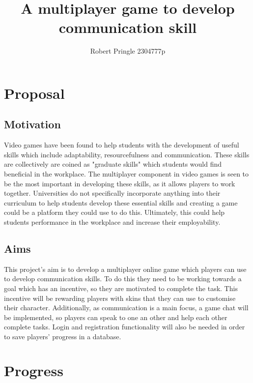 \documentclass[11pt]{article}
\title{A multiplayer game to develop communication skill}
\author{Robert Pringle 2304777p}
\begin{document}
    \maketitle

\section{Proposal}\label{proposal}

\subsection{Motivation}\label{motivation}

Video games have been found to help students with the development of useful skills which include adaptability, resourcefulness and communication. These skills are collectively are coined as "graduate skills" which students would find beneficial in the workplace. The multiplayer component in video games is seen to be the most important in developing these skills, as it allows players to work together. Universities do not specifically incorporate anything into their curriculum to help students develop these essential skills and creating a game could be a platform they could use to do this. Ultimately, this could help students performance in the workplace and increase their employability.

\subsection{Aims}\label{aims}
This project's aim is to develop a multiplayer online game which players can use to develop communication skills. To do this they need to be working towards a goal which has an incentive, so they are motivated to complete the task. This incentive will be rewarding players with skins that they can use to customise their character. Additionally, as communication is a main focus, a game chat will be implemented, so players can speak to one an other and help each other complete tasks. Login and registration functionality will also be needed in order to save players' progress in a database.


\section{Progress}\label{progress}
\end{document}
